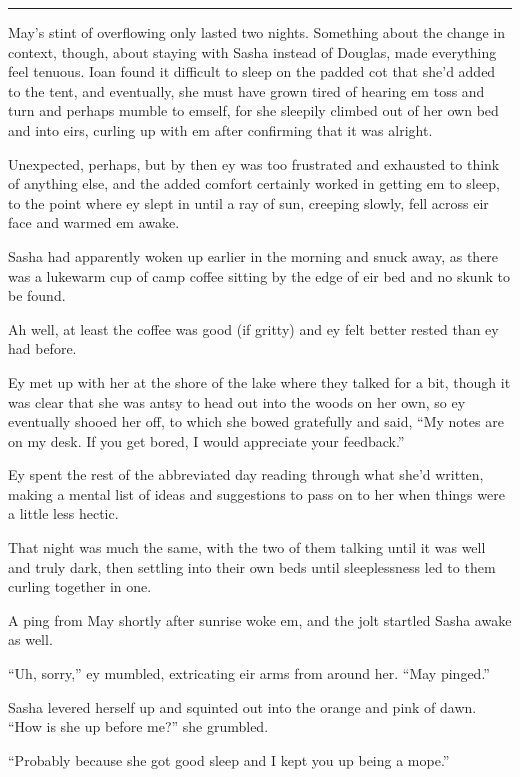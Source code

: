 \begin{center}\rule{0.5\linewidth}{0.5pt}\end{center}

May's stint of overflowing only lasted two nights. Something about the change in context, though, about staying with Sasha instead of Douglas, made everything feel tenuous. Ioan found it difficult to sleep on the padded cot that she'd added to the tent, and eventually, she must have grown tired of hearing em toss and turn and perhaps mumble to emself, for she sleepily climbed out of her own bed and into eirs, curling up with em after confirming that it was alright.

Unexpected, perhaps, but by then ey was too frustrated and exhausted to think of anything else, and the added comfort certainly worked in getting em to sleep, to the point where ey slept in until a ray of sun, creeping slowly, fell across eir face and warmed em awake.

Sasha had apparently woken up earlier in the morning and snuck away, as there was a lukewarm cup of camp coffee sitting by the edge of eir bed and no skunk to be found.

Ah well, at least the coffee was good (if gritty) and ey felt better rested than ey had before.

Ey met up with her at the shore of the lake where they talked for a bit, though it was clear that she was antsy to head out into the woods on her own, so ey eventually shooed her off, to which she bowed gratefully and said, ``My notes are on my desk. If you get bored, I would appreciate your feedback.''

Ey spent the rest of the abbreviated day reading through what she'd written, making a mental list of ideas and suggestions to pass on to her when things were a little less hectic.

That night was much the same, with the two of them talking until it was well and truly dark, then settling into their own beds until sleeplessness led to them curling together in one.

A ping from May shortly after sunrise woke em, and the jolt startled Sasha awake as well.

``Uh, sorry,'' ey mumbled, extricating eir arms from around her. ``May pinged.''

Sasha levered herself up and squinted out into the orange and pink of dawn. ``How is she up before me?'' she grumbled.

``Probably because she got good sleep and I kept you up being a mope.''

